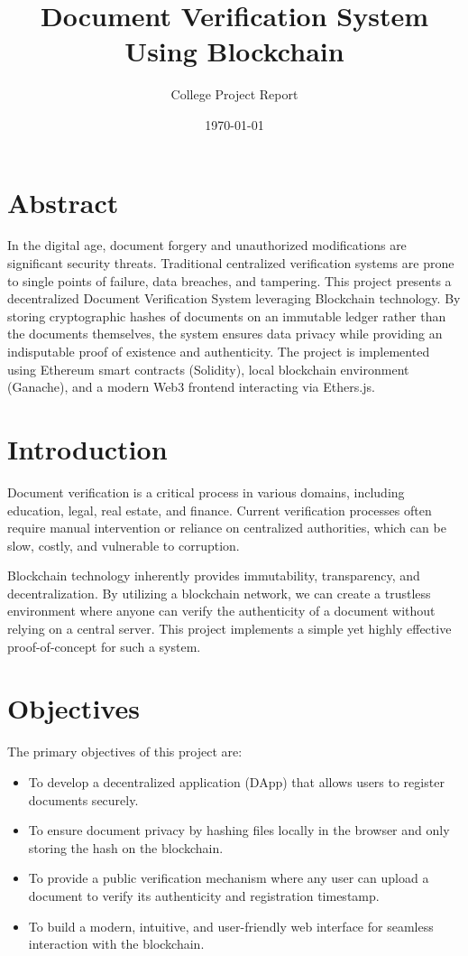 \documentclass[12pt, a4paper]{article}
\title{\textbf{Document Verification System Using Blockchain}}
\author{College Project Report}
\date{\today}
\begin{document}
\maketitle
\tableofcontents
\newpage

\section{Abstract}
In the digital age, document forgery and unauthorized modifications are significant security threats. Traditional centralized verification systems are prone to single points of failure, data breaches, and tampering. This project presents a decentralized Document Verification System leveraging Blockchain technology. By storing cryptographic hashes of documents on an immutable ledger rather than the documents themselves, the system ensures data privacy while providing an indisputable proof of existence and authenticity. The project is implemented using Ethereum smart contracts (Solidity), local blockchain environment (Ganache), and a modern Web3 frontend interacting via Ethers.js.

\section{Introduction}
Document verification is a critical process in various domains, including education, legal, real estate, and finance. Current verification processes often require manual intervention or reliance on centralized authorities, which can be slow, costly, and vulnerable to corruption. 

Blockchain technology inherently provides immutability, transparency, and decentralization. By utilizing a blockchain network, we can create a trustless environment where anyone can verify the authenticity of a document without relying on a central server. This project implements a simple yet highly effective proof-of-concept for such a system.

\section{Objectives}
The primary objectives of this project are:
\begin{itemize}
    \item To develop a decentralized application (DApp) that allows users to register documents securely.
    \item To ensure document privacy by hashing files locally in the browser and only storing the hash on the blockchain.
    \item To provide a public verification mechanism where any user can upload a document to verify its authenticity and registration timestamp.
    \item To build a modern, intuitive, and user-friendly web interface for seamless interaction with the blockchain.
\end{itemize}
\end{document}
